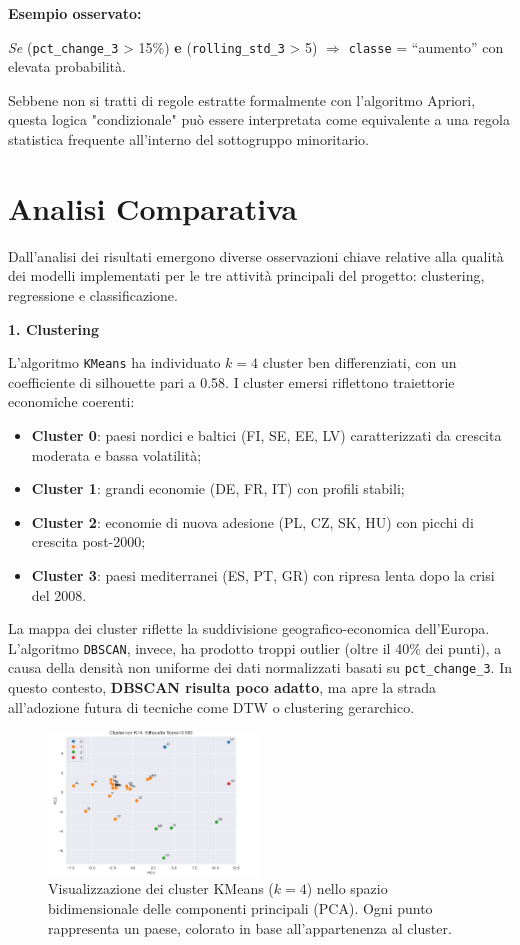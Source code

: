 \documentclass[conference]{IEEEtran}
\begin{document}
\noindent\textbf{Esempio osservato:}

{\centering \textit{Se} (\texttt{pct\_change\_3} > 15\%) \textbf{e} (\texttt{rolling\_std\_3} > 5) $\Rightarrow$ \texttt{classe} = “aumento” con elevata probabilità.}

Sebbene non si tratti di regole estratte formalmente con l’algoritmo Apriori, questa logica "condizionale" può essere interpretata come equivalente a una regola statistica frequente all’interno del sottogruppo minoritario.

\section*{\Large \textbf{Analisi Comparativa}}

Dall’analisi dei risultati emergono diverse osservazioni chiave relative alla qualità dei modelli implementati per le tre attività principali del progetto: clustering, regressione e classificazione.

\vspace{1em}\noindent\textbf{1. Clustering}

L’algoritmo \texttt{KMeans} ha individuato $k = 4$ cluster ben differenziati, con un coefficiente di silhouette pari a 0.58. I cluster emersi riflettono traiettorie economiche coerenti:

\begin{itemize}
  \item \textbf{Cluster 0}: paesi nordici e baltici (FI, SE, EE, LV) caratterizzati da crescita moderata e bassa volatilità;
  \item \textbf{Cluster 1}: grandi economie (DE, FR, IT) con profili stabili;
  \item \textbf{Cluster 2}: economie di nuova adesione (PL, CZ, SK, HU) con picchi di crescita post-2000;
  \item \textbf{Cluster 3}: paesi mediterranei (ES, PT, GR) con ripresa lenta dopo la crisi del 2008.
\end{itemize}
La mappa dei cluster riflette la suddivisione geografico-economica dell’Europa. L’algoritmo \texttt{DBSCAN}, invece, ha prodotto troppi outlier (oltre il 40\% dei punti), a causa della densità non uniforme dei dati normalizzati basati su \texttt{pct\_change\_3}. In questo contesto, \textbf{DBSCAN risulta poco adatto}, ma apre la strada all’adozione futura di tecniche come DTW o clustering gerarchico.
\begin{figure}[H]
\centering
\includegraphics[width=0.5\textwidth]{images/Kmeans}
\caption{Visualizzazione dei cluster KMeans ($k=4$) nello spazio bidimensionale delle componenti principali (PCA). Ogni punto rappresenta un paese, colorato in base all’appartenenza al cluster.}
\label{fig:kmeans-cluster-map}
\end{figure}
\end{document}
